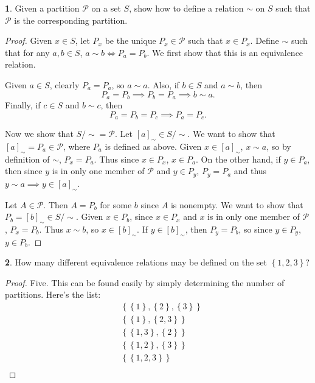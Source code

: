 \documentclass{article}
\newcounter{section-number}
\theoremstyle{definition}
\newtheorem{ex}{}[section-number]
\begin{document}
\begin{ex}
	Given a partition $\mathscr{P}$ on a set $S$, show how to define a relation $\sim$ on $S$ such that $\mathscr{P}$ is the corresponding partition.
\end{ex}
\begin{proof}
	Given $x \in S$, let $P_x$ be the unique $P_x \in \mathscr{P}$ such that $x \in P_x$.
	Define $\sim$ such that for any $a, b \in S$, $a \sim b \iff P_a = P_b$.
	We first show that this is an equivalence relation.

	Given $a \in S$, clearly $P_a = P_a$, so $a \sim a$.
	Also, if $b \in S$ and $a \sim b$, then \begin{equation*}
		P_a = P_b \implies P_b = P_a \implies b \sim a.
	\end{equation*}
	Finally, if $c \in S$ and $b \sim c$, then \begin{equation*}
		P_a = P_b = P_c \implies P_a = P_c.
	\end{equation*}

	Now we show that $S/{\sim} = \mathscr{P}$.
	Let $[a]_\sim \in S/{\sim}$.
	We want to show that $[a]_\sim = P_a \in \mathscr{P}$, where $P_a$ is defined as above.
	Given $x \in [a]_\sim$, $x \sim a$, so by definition of $\sim$, $P_x = P_a$.
	Thus since $x \in P_x$, $x \in P_a$.
	On the other hand, if $y \in P_a$, then since $y$ is in only one member of $\mathscr{P}$ and $y \in P_y$, $P_y = P_a$ and thus $y \sim a \implies y \in [a]_\sim$.

	Let $A \in \mathscr{P}$.
	Then $A = P_b$ for some $b$ since $A$ is nonempty.
	We want to show that $P_b = [b]_\sim \in S/{\sim}$.
	Given $x \in P_b$, since $x \in P_x$ and $x$ is in only one member of $\mathscr{P}$, $P_x = P_b$.
	Thus $x \sim b$, so $x \in [b]_\sim$.
	If $y \in [b]_\sim$, then $P_y = P_b$, so since $y \in P_y$, $y \in P_b$.
\end{proof}

\begin{ex}
	How many different equivalence relations may be defined on the set $\left\lbrace 1, 2, 3 \right\rbrace$?
\end{ex}
\begin{proof}
	Five.
	This can be found easily by simply determining the number of partitions.
	Here's the list: \begin{align*}
		 & \left\lbrace \left\lbrace 1 \right\rbrace, \left\lbrace 2 \right\rbrace, \left\lbrace 3 \right\rbrace \right\rbrace \\
		 & \left\lbrace \left\lbrace 1 \right\rbrace, \left\lbrace 2, 3 \right\rbrace \right\rbrace                            \\
		 & \left\lbrace \left\lbrace 1, 3 \right\rbrace, \left\lbrace 2 \right\rbrace \right\rbrace                            \\
		 & \left\lbrace \left\lbrace 1, 2 \right\rbrace, \left\lbrace 3 \right\rbrace \right\rbrace                            \\
		 & \left\lbrace \left\lbrace 1, 2, 3 \right\rbrace \right\rbrace                                                       \\
	\end{align*}
\end{proof}
\end{document}
